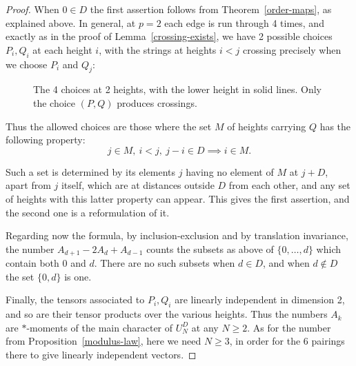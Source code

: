 \documentclass[11pt,a4paper]{article}
\begin{document}
\begin{proof}
When $0\in D$ the first assertion follows from Theorem~\ref{order-maps}, as explained above. In general, at $p=2$ each edge is run through 4 times, and exactly as in the proof of Lemma~\ref{crossing-exists}, we have 2 possible choices $P_i,Q_i$ at each height $i$, with the strings at heights $i<j$ crossing precisely when we choose $P_i$ and $Q_j$:

\begin{figure}[H]\centering
{}
\caption{The 4 choices at 2 heights, with the lower height in solid lines. Only the choice $(P,Q)$ produces crossings.}
\label{four-pairings}
\end{figure}

Thus the allowed choices are those where the set $M$ of heights carrying $Q$ has the following property:
\[
 j\in M,\ i<j,\ j-i\in D\implies i\in M.
\]

Such a set is determined by its elements $j$ having no element of $M$ at $j+D$, apart from $j$ itself, which are at distances outside $D$ from each other, and any set of heights with this latter property can appear. This gives the first assertion, and the second one is a reformulation of it.

Regarding now the formula, by inclusion-exclusion and by translation invariance, the number $A_{d+1}-2A_d+A_{d-1}$ counts the subsets as above of $\{0,\ldots,d\}$ which contain both $0$ and $d$. There are no such subsets when $d\in D$, and when $d\notin D$ the set $\{0,d\}$ is one.

Finally, the tensors associated to $P_i,Q_i$ are linearly independent in dimension 2, and so are their tensor products over the various heights. Thus the numbers $A_k$ are $*$-moments of the main character of $U_N^D$ at any $N\geq2$. As for the number from Proposition~\ref{modulus-law}, here we need $N\geq3$, in order for the 6 pairings there to give linearly independent vectors.
\end{proof}
\end{document}
